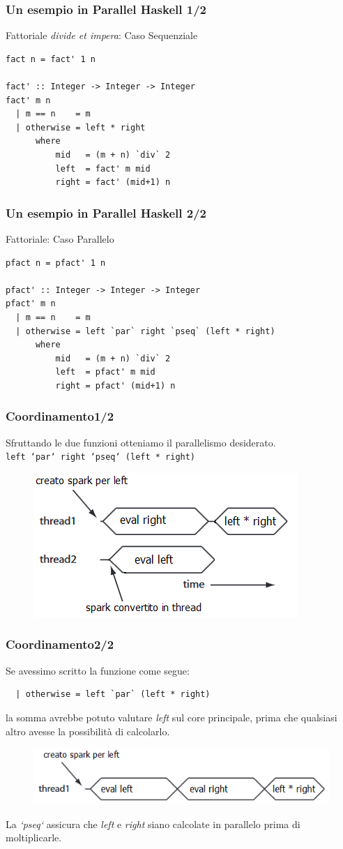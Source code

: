 \documentclass[14pt]{beamer}
\begin{document}
\begin{frame}[fragile]
\frametitle{Un esempio in Parallel Haskell \hfill 1/2}
Fattoriale \emph{divide et impera}: Caso Sequenziale
\small 
\begin{verbatim}
fact n = fact' 1 n

fact' :: Integer -> Integer -> Integer
fact' m n
  | m == n    = m
  | otherwise = left * right
      where 
          mid   = (m + n) `div` 2
          left  = fact' m mid
          right = fact' (mid+1) n
\end{verbatim}
\end{frame}

\begin{frame}[fragile]
\frametitle{Un esempio in Parallel Haskell \hfill 2/2}
Fattoriale: Caso Parallelo
\small 
\begin{verbatim}
pfact n = pfact' 1 n

pfact' :: Integer -> Integer -> Integer
pfact' m n
  | m == n    = m
  | otherwise = left `par` right `pseq` (left * right)
      where 
          mid   = (m + n) `div` 2
          left  = pfact' m mid
          right = pfact' (mid+1) n
\end{verbatim}
\end{frame}

\begin{frame}
\frametitle{Coordinamento\hfill 1/2}
Sfruttando le due funzioni otteniamo il parallelismo desiderato.\\[2ex]
\texttt{left `par` right `pseq` (left * right)}
\begin{figure}
    \centering
    \includegraphics[width=6 cm]{./desired_par}
  \end{figure}
\end{frame}

\begin{frame}[fragile]
\frametitle{Coordinamento\hfill 2/2}
Se avessimo scritto la funzione come segue:
\begin{verbatim}
  | otherwise = left `par` (left * right)
\end{verbatim}
la somma avrebbe potuto valutare \textit{left} sul core principale, prima che qualsiasi altro avesse la possibilità di calcolarlo.
\begin{figure}
    \centering
    \includegraphics[width=8 cm]{./not_desired_par}
  \end{figure}


La \textit{`pseq`} assicura che \textit{left} e \textit{right} siano calcolate in parallelo prima di moltiplicarle.
\end{frame}
\end{document}
